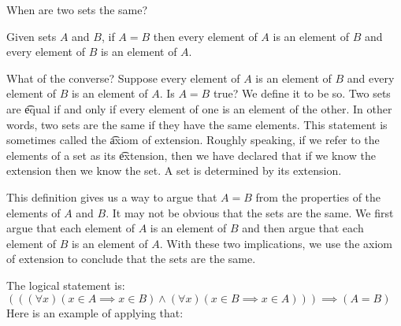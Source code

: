 

When are two sets the same?


Given sets $A$ and $B$, if $A = B$ then every element of $A$ is an element of $B$ and every element of $B$ is an element of $A$.

\begin{account}
\end{account}



What of the converse?
Suppose every element of $A$ is an element of $B$ and every element of $B$ is an element of $A$.
Is $A = B$ true?
We define it to be so.
Two sets are \t{equal} if and only if every element of one is an element of the other.
In other words, two sets are the same if they have the same elements.
This statement is sometimes called the \t{axiom of extension}.
Roughly speaking, if we refer to the elements of a set as its \t{extension}, then we have declared that if we know the extension then we know the set.
A set is determined by its extension.

This definition gives us a way to argue that $A = B$ from the properties of the elements of $A$ and $B$.
It may not be obvious that the sets are the same.
We first argue that each element of $A$ is an element of $B$ and then argue that each element of $B$ is an element of $A$.
With these two implications, we use the axiom of extension to conclude that the sets are the same.


The logical statement is: $(((\forall x)(x \in A \implies x \in B) \land (\forall x)(x \in B \implies x \in A))) \implies (A = B)$
Here is an example of applying that:

\begin{account}[Extension]
\end{account}


